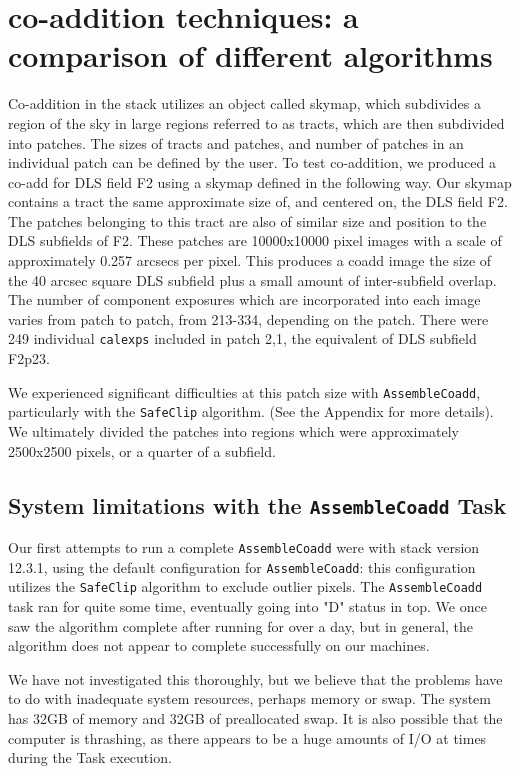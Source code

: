 \documentclass[DM,toc]{lsstdoc}
\begin{document}
\section{co-addition techniques: a comparison of different algorithms}
Co-addition in the stack utilizes an object called skymap, which subdivides a region of the sky in large regions referred to as tracts, which are then subdivided into patches. The sizes of tracts and patches, and number of patches in an individual patch can be defined by the user. To test co-addition, we produced a co-add for DLS field F2 using a skymap defined in the following way. Our skymap contains a tract the same approximate size of, and centered on, the DLS field F2. The patches belonging to this tract are also of similar size and position to the DLS subfields of F2. These patches are 10000x10000 pixel images with a scale of approximately 0.257 arcsecs per pixel. This produces a coadd image the size of the 40 arcsec square DLS subfield plus a small amount of inter-subfield overlap. The number of component exposures which are incorporated into each image varies from patch to patch, from 213-334, depending on the patch. There were 249 individual {\tt\string calexps} included in patch 2,1, the equivalent of DLS subfield F2p23.

We experienced significant difficulties at this patch size with {\tt\string AssembleCoadd}, particularly with the {\tt\string SafeClip} algorithm. (See the Appendix for more details). We ultimately divided the patches into regions which were approximately 2500x2500 pixels, or a quarter of a subfield.
\subsection{System limitations with the {\tt\string AssembleCoadd} Task}
Our first attempts to run a complete {\tt\string AssembleCoadd} were with stack version 12.3.1, using the default configuration for {\tt\string AssembleCoadd}: this configuration utilizes the {\tt\string SafeClip} algorithm to exclude outlier pixels. The {\tt\string AssembleCoadd} task ran for quite some time, eventually going into "D" status in top. We once saw the algorithm complete after running for over a day, but in general, the algorithm does not appear to complete successfully on our machines.

We have not investigated this thoroughly, but we believe that the problems have to do with inadequate system resources, perhaps memory or swap. The system has 32GB of memory and 32GB of preallocated swap.  It is also possible that the computer is thrashing, as there appears to be a huge amounts of I/O at times during the Task execution.
\end{document}
